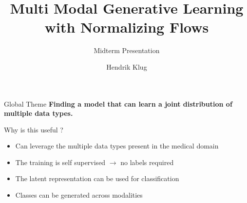 

\title[Multi Modal Generative Learning with Normalizing Flows]{Multi Modal Generative Learning with Normalizing Flows}
\subtitle{Midterm Presentation}
\author[Hendrik Klug]{Hendrik Klug}


    \begin{frame}
        \titlepage
    \end{frame}

    \begin{frame}{Global Theme}
        \centering
        \textbf{Finding a model that can learn a joint distribution of multiple data types.}

        \begin{figure}
        \end{figure}
    \end{frame}

    \begin{frame}{Why is this useful ?}
        \begin{itemize}
            \item Can leverage the multiple data types present in the medical domain
            \item The training is self supervised $\rightarrow$ no labels required
            \item The latent representation can be used for classification
            \item Classes can be generated across modalities
        \end{itemize}
    \end{frame}


